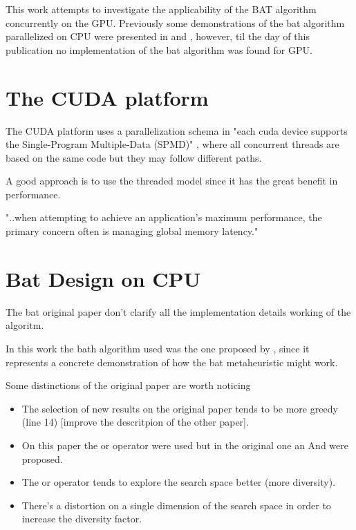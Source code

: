 \documentclass[conference]{IEEEtran}
\begin{document}
This work attempts to investigate the applicability of the BAT algorithm
concurrently on the GPU. Previously some demonstrations of the bat
algorithm parallelized on CPU were presented in \cite{paralellCPUFirst}
and \cite{paralellCPU}, however, til the day of this publication no
implementation of the bat algorithm was found for GPU. 

\section{The CUDA platform}

The CUDA platform uses a parallelization schema in "each cuda
device supports the Single-Program Multiple-Data (SPMD)"
\cite{cuda_optimizations}, where all concurrent threads are based on the
same code but they may follow different paths.

A good approach is to use the threaded model since it has the great benefit in performance.

"..when attempting to achieve an application's maximum
performance, the primary concern often is managing global memory
latency." \cite{cuda_optimizations}

\section{Bat Design on CPU}

The bat original paper don't clarify  all the implementation details working of the algoritm.

In this work the bath algorithm used was the one proposed by
\autocite{Jelson et al.}, since it represents a concrete demonstration of how
the bat metaheuristic might work.  

Some distinctions of the original paper are worth noticing

\begin{itemize}
    \item The selection of new results on the original paper tends to be more greedy (line 14) [improve the descritpion of the other paper].
    \item On this paper the or operator were used but in the original one an And were proposed.
    \item The or operator tends to explore the search space better (more diversity).

    \item There's a distortion on a single dimension of the search space in
order to increase the diversity factor.
\end{itemize}
\end{document}
